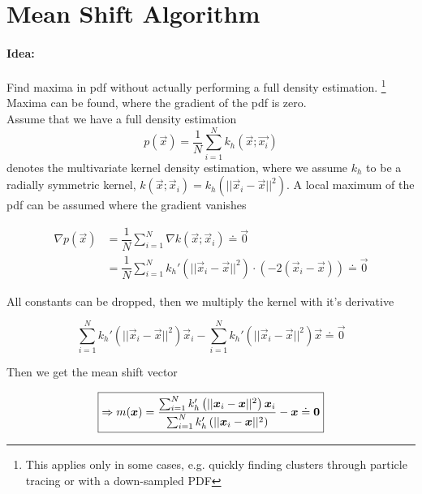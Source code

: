 
\section{Mean Shift Algorithm~\cite{meanshift}}

\paragraph{Idea:}
Find maxima in pdf without actually performing a full density estimation. \footnote{This applies only in some cases, e.g. quickly finding clusters through particle tracing or with a down-sampled PDF} Maxima can be found, where the gradient of the pdf is zero. \\

Assume that we have a full density estimation
\begin{equation*}
p(\vec{x}) = \dfrac{1}{N} \sum_{i=1}^N k_h(\vec{x}; \vec{x_i})
\end{equation*}
denotes the multivariate kernel density estimation, where we assume $k_h$ to be a radially symmetric kernel, \ie $k(\vec{x}; \vec{x}_i) = k_h(||\vec{x}_i - \vec{x}||^2)$. 
A local maximum of the pdf can be assumed where the gradient vanishes 


\begin{align*}
	\nabla p(\vec{x}) &= \dfrac{1}{N} \sum_{i=1}^N \nabla k(\vec{x}; \vec{x}_i) \doteq \vec{0} \\
	&= \dfrac{1}{N} \sum_{i=1}^N k_h'\left(||\vec{x}_i - \vec{x}||^2\right) \cdot (-2 (\vec{x}_i - \vec{x})) \doteq \vec{0}
\end{align*}

All constants can be dropped, then we multiply the kernel with it's derivative

\begin{equation*}
  \sum_{i=1}^N k_h'\left(||\vec{x}_i - \vec{x}||^2\right) \vec{x}_i - \sum_{i=1}^N k_h'\left(||\vec{x}_i - \vec{x}||^2\right) \vec{x} \doteq \vec{0}
\end{equation*}

Then we get the mean shift vector

\begin{equation*}
  \boxed{\label{mean-shift-vector}
  \Rightarrow m(\vec{x}) = \dfrac{\sum_{i=1}^N k_h'\left(||\vec{x}_i - \vec{x}||^2\right) \vec{x}_i}{\sum_{i=1}^N k_h'\left(||\vec{x}_i - \vec{x}||^2\right)} - \vec{x} \doteq \vec{0}}
\end{equation*}

